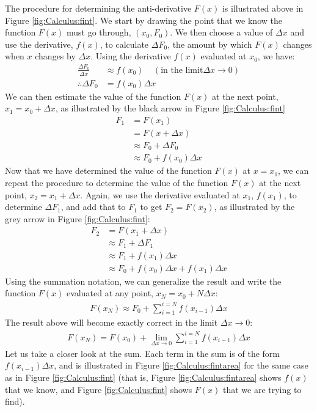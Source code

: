 The procedure for determining the anti-derivative $F(x)$ is illustrated above in Figure \ref{fig:Calculus:fint}. We start by drawing the point that we know the function $F(x)$ must go through, $(x_0,F_0)$. We then choose a value of $\Delta x$ and use the derivative, $f(x)$, to calculate $\Delta F_0$, the amount by which $F(x)$ changes when $x$ changes by $\Delta x$. Using the derivative $f(x)$ evaluated at $x_0$, we have:
\begin{align*}
\frac{\Delta F_0}{\Delta x} &\approx f(x_0)\;\;\;\; (\text{in the limit} \Delta x\to 0 )\\
\therefore \Delta F_0 &= f(x_0) \Delta x
\end{align*}
We can then estimate the value of the function $F(x)$ at the next point, $x_1=x_0+\Delta x$, as illustrated by the black arrow in Figure \ref{fig:Calculus:fint} 
\begin{align*}
F_1&=F(x_1)\\
&=F(x+\Delta x) \\
&\approx F_0 + \Delta F_0\\
&\approx F_0+f(x_0)\Delta x
\end{align*}
Now that we have determined the value of the function $F(x)$ at $x=x_1$, we can repeat the procedure to determine the value of the function $F(x)$ at the next point, $x_2=x_1+\Delta x$. Again, we use the derivative evaluated at $x_1$, $f(x_1)$, to determine $\Delta F_1$, and add that to $F_1$ to get $F_2=F(x_2)$, as illustrated by the grey arrow in Figure \ref{fig:Calculus:fint}:
\begin{align*}
F_2&=F(x_1+\Delta x) \\
&\approx F_1+\Delta F_1\\
&\approx F_1+f(x_1)\Delta x\\
&\approx F_0+f(x_0)\Delta x+f(x_1)\Delta x
\end{align*}
Using the summation notation, we can generalize the result and write the function $F(x)$ evaluated at any point, $x_N=x_0+N\Delta x$:
\begin{align*}
F(x_N) \approx F_0+\sum_{i=1}^{i=N} f(x_{i-1}) \Delta x
\end{align*}
The result above will become exactly correct in the limit $\Delta x\to 0$:
\begin{align}
\label{eqn:Calculus:intsum}
F(x_N) = F(x_0)+\lim_{\Delta x\to 0}\sum_{i=1}^{i=N} f(x_{i-1}) \Delta x
\end{align}
Let us take a closer look at the sum. Each term in the sum is of the form $f(x_{i-1})\Delta x$, and is illustrated in Figure \ref{fig:Calculus:fintarea} for the same case as in Figure \ref{fig:Calculus:fint} (that is, Figure \ref{fig:Calculus:fintarea} shows $f(x)$ that we know, and Figure \ref{fig:Calculus:fint} shows $F(x)$ that we are trying to find).

